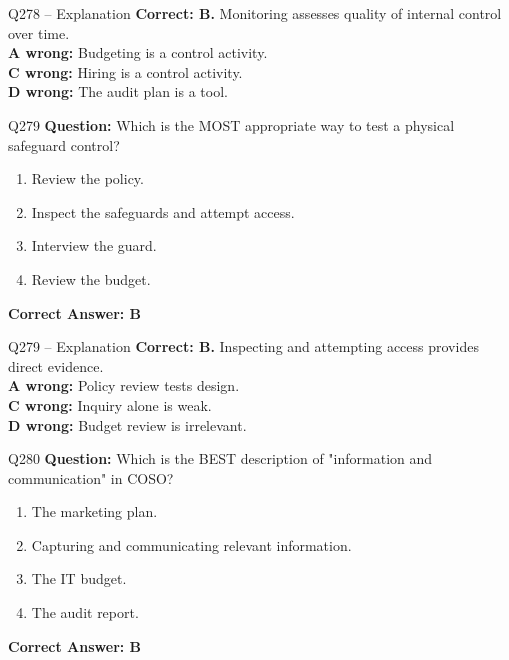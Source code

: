 \documentclass[aspectratio=169,10pt]{beamer}
\begin{document}
	\begin{frame}[t]{Q278 -- Explanation}
		\small
		\textbf{Correct: B.} Monitoring assesses quality of internal control over time. \\[4pt]
		\textbf{A wrong:} Budgeting is a control activity. \\[2pt]
		\textbf{C wrong:} Hiring is a control activity. \\[2pt]
		\textbf{D wrong:} The audit plan is a tool.
	\end{frame}
	
	\begin{frame}[t]{Q279}
		\small
		\textbf{Question:} Which is the MOST appropriate way to test a physical safeguard control?
		\begin{enumerate}[label=\Alph*.,itemsep=1pt,topsep=2pt]
			\item Review the policy.
			\item Inspect the safeguards and attempt access.
			\item Interview the guard.
			\item Review the budget.
		\end{enumerate}
		\vspace{4pt}
		\textbf{Correct Answer: B}
	\end{frame}
	
	\begin{frame}[t]{Q279 -- Explanation}
		\small
		\textbf{Correct: B.} Inspecting and attempting access provides direct evidence. \\[4pt]
		\textbf{A wrong:} Policy review tests design. \\[2pt]
		\textbf{C wrong:} Inquiry alone is weak. \\[2pt]
		\textbf{D wrong:} Budget review is irrelevant.
	\end{frame}
	
	\begin{frame}[t]{Q280}
		\small
		\textbf{Question:} Which is the BEST description of "information and communication" in COSO?
		\begin{enumerate}[label=\Alph*.,itemsep=1pt,topsep=2pt]
			\item The marketing plan.
			\item Capturing and communicating relevant information.
			\item The IT budget.
			\item The audit report.
		\end{enumerate}
		\vspace{4pt}
		\textbf{Correct Answer: B}
	\end{frame}
	
\end{document}
